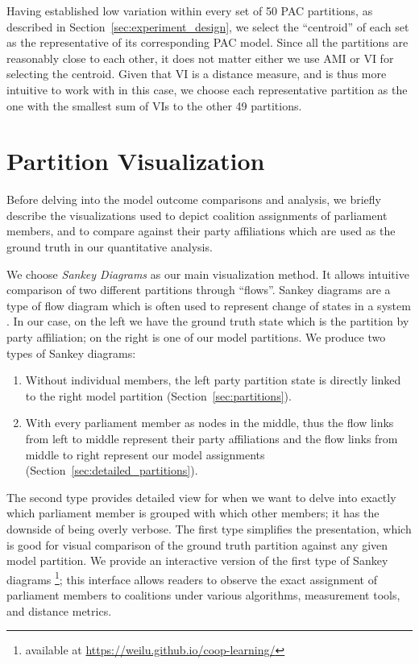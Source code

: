 Having established low variation within every set of 50
PAC partitions, as described in Section~\ref{sec:experiment_design}, we select
the ``centroid'' of each set as the representative of its corresponding PAC model.
Since all the partitions are reasonably close to each other, it does not
matter either we use AMI or VI for selecting the centroid.
Given that VI is a distance measure, and is thus more intuitive to work with in
this case, we choose each representative partition as the one with the smallest
sum of VIs to the other 49 partitions.

\section{Partition Visualization}
\label{sec:partition_visualization}

Before delving into the model outcome comparisons and analysis, we briefly
describe the visualizations used to depict coalition assignments of parliament members, and to compare against their party affiliations which are
used as the ground truth in our quantitative analysis.

We choose \textit{Sankey Diagrams} as our main visualization method. 
It allows intuitive comparison of two different partitions through ``flows''.
Sankey diagrams are a type of flow diagram which is often used to represent
change of states in a system \cite{doi:10.1111/j.1530-9290.2008.00004.x}.
In our case, on the left we have the ground truth state which is the partition
by party affiliation; on the right is one of our model partitions.
We produce two types of Sankey diagrams:

\begin{enumerate}
  \item Without individual members, the left party partition state is directly
    linked to the right model partition (Section~\ref{sec:partitions}).
  \item With every parliament member as nodes in the middle, thus the flow links
    from left to middle represent their party affiliations and the flow links
    from middle to right represent our model assignments
    (Section~\ref{sec:detailed_partitions}).
\end{enumerate}

The second type provides detailed view for when we want to delve into exactly
which parliament member is grouped with which other members; it has the
downside of being overly verbose.
The first type simplifies the presentation, which is good for visual comparison
of the ground truth partition against any given model partition.
We provide an interactive version of the first type of Sankey diagrams
\footnote{available at \url{https://weilu.github.io/coop-learning/}}; this
interface allows readers to observe the exact assignment of parliament members
to coalitions under various algorithms, measurement tools, and distance metrics.

